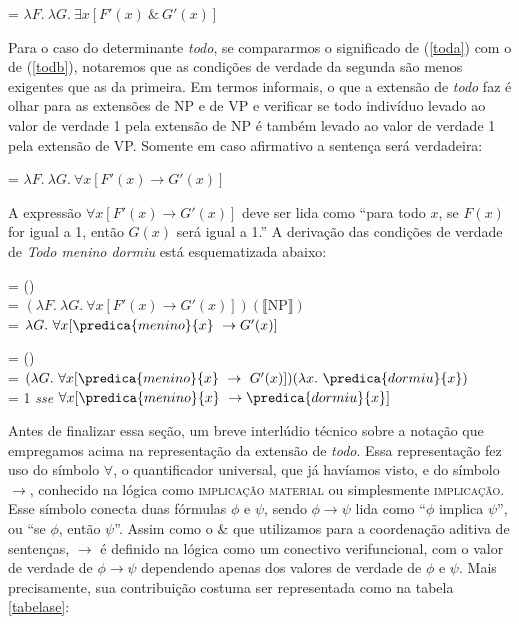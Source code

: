 \begin{exe}
	\ex {} = $\lambda F.\ \lambda G.\ \exists x [ F'(x)\ \& \ G'(x)]$
\end{exe}

Para o caso do determinante \textit{todo}, se compararmos o significado de (\ref{toda}) com o de
(\ref{todb}), notaremos que as condições de verdade da segunda são
menos exigentes que as da primeira. Em termos informais, o que a
extensão de \textit{todo} faz é olhar para as extensões de NP e de VP e
verificar se todo indivíduo levado ao valor de verdade 1 pela
extensão de NP é também levado ao valor de verdade 1 pela extensão
de VP. Somente em caso afirmativo a sentença será
verdadeira:

\begin{exe}
	\ex {} = $\lambda F.\ \lambda G.\ \forall x [F'(x) \rightarrow G'(x)]$
\end{exe}

\n A expressão $\forall x [ F'(x) \rightarrow G'(x)]$ deve ser lida como ``para todo $x$, se $F(x)$ for igual a 1, então $G(x)$ será igual a 1.'' A derivação das condições de verdade de \textit{Todo menino dormiu} está esquematizada abaixo:

\begin{exe}
	\ex {} = ()\\
	= $(\lambda F.\ \lambda G.\ \forall x [F'(x) \rightarrow G'(x)])(\llbracket \text{NP} \rrbracket)$\\
	= $\lambda G.\ \forall x [ \predica{menino}{x}\ \rightarrow G'(x)]$
\end{exe}

\begin{exe}
	\ex {} = ()\\
	= $(\lambda G.\ \forall x [\predica{menino}{x}\ \rightarrow \ G'(x)])(\lambda x.\ \predica{dormiu}{x})$\\
	= 1 \textit{sse} $\forall x [\predica{menino}{x}\ \rightarrow \predica{dormiu}{x}]$
\end{exe}

Antes de finalizar essa seção, um breve interlúdio técnico sobre a notação que empregamos acima na representação da extensão de \textit{todo}. Essa representação fez uso do símbolo $\forall$, o quantificador universal, que já havíamos visto, e do símbolo $\rightarrow$, conhecido na lógica como \textsc{implicação material} ou simplesmente \textsc{implicação}. Esse símbolo conecta duas fórmulas $\phi$ e $\psi$, sendo $\phi \rightarrow \psi$ lida como ``$\phi$ implica $\psi$'', ou ``se $\phi$, então $\psi$''. Assim como o \& que utilizamos para a coordenação aditiva de sentenças, $\rightarrow$ é definido na lógica como um conectivo verifuncional, com o valor de verdade de $\phi \rightarrow \psi$ dependendo apenas dos valores de verdade de $\phi$ e $\psi$. Mais precisamente, sua contribuição costuma ser representada como na tabela \ref{tabelase}:

